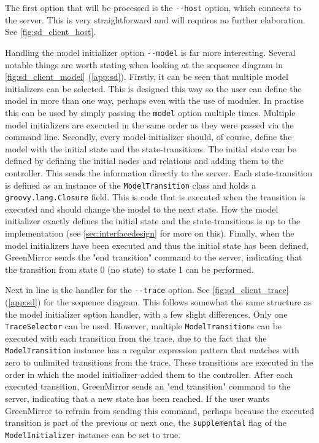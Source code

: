 \documentclass[a4paper]{article}
\begin{document}
The first option that will be processed is the \lstinline{--host} option, which connects to the server. This is very straightforward and will requires no further elaboration. See \cref{fig:sd_client_host}.

Handling the model initializer option \lstinline{--model} is far more interesting. Several notable things are worth stating when looking at the sequence diagram in \cref{fig:sd_client_model} (\cref{app:sd}). Firstly, it can be seen that multiple model initializers can be selected. This is designed this way so the user can define the model in more than one way, perhaps even with the use of modules. In practise this can be used by simply passing the \lstinline{model} option multiple times. Multiple model initializers are executed in the same order as they were passed via the command line. Secondly, every model initializer should, of course, define the model with the initial state and the state-transitions. The initial state can be defined by defining the initial nodes and relations and adding them to the controller. This sends the information directly to the server. Each state-transition is defined as an instance of the \lstinline{ModelTransition} class and holds a \lstinline{groovy.lang.Closure} field. This is code that is executed when the transition is executed and should change the model to the next state. How the model initializer exactly defines the initial state and the state-transitions is up to the implementation (see \cref{sec:interfacedesign} for more on this). Finally, when the model initializers have been executed and thus the initial state has been defined, GreenMirror sends the "end transition" command to the server, indicating that the transition from state 0 (no state) to state 1 can be performed. 

Next in line is the handler for the \lstinline{--trace} option. See \cref{fig:sd_client_trace} (\cref{app:sd}) for the sequence diagram. This follows somewhat the same structure as the model initializer option handler, with a few slight differences. Only one \lstinline{TraceSelector} can be used. However, multiple \lstinline{ModelTransition}s can be executed with each transition from the trace, due to the fact that the \lstinline{ModelTransition} instance has a regular expression pattern that matches with zero to unlimited transitions from the trace. These transitions are executed in the order in which the model initializer added them to the controller. After each executed transition, GreenMirror sends an "end transition" command to the server, indicating that a new state has been reached. If the user wants GreenMirror to refrain from sending this command, perhaps because the executed transition is part of the previous or next one, the \lstinline{supplemental} flag of the \lstinline{ModelInitializer} instance can be set to true.
\end{document}
